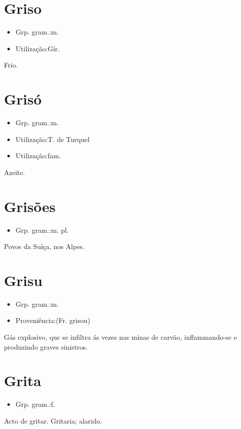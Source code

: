 \section{Griso}
\begin{itemize}
\item {Grp. gram.:m.}
\end{itemize}
\begin{itemize}
\item {Utilização:Gír.}
\end{itemize}
Frio.
\section{Grisó}
\begin{itemize}
\item {Grp. gram.:m.}
\end{itemize}
\begin{itemize}
\item {Utilização:T. de Turquel}
\end{itemize}
\begin{itemize}
\item {Utilização:fam.}
\end{itemize}
Azeite.
\section{Grisões}
\begin{itemize}
\item {Grp. gram.:m. pl.}
\end{itemize}
Povos da Suíça, nos Alpes.
\section{Grisu}
\begin{itemize}
\item {Grp. gram.:m.}
\end{itemize}
\begin{itemize}
\item {Proveniência:(Fr. \textunderscore grisou\textunderscore )}
\end{itemize}
Gás explosivo, que se infiltra ás vezes nas minas de carvão, inflammando-se e produzindo graves sinistros.
\section{Grita}
\begin{itemize}
\item {Grp. gram.:f.}
\end{itemize}
Acto de gritar.
Gritaria; alarido.
